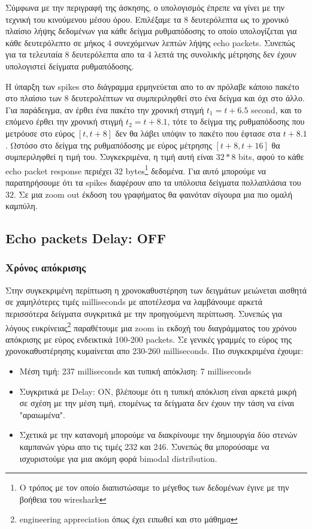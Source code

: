 \documentclass[hidelinks, 12pt, a4paper]{article}
\begin{document}
Σύμφωνα με την περιγραφή της άσκησης, ο υπολογισμός έπρεπε να γίνει με την τεχνική του κινούμενου μέσου όρου. Επιλέξαμε τα 8 δευτερόλεπτα ως το χρονικό πλαίσιο λήψης δεδομένων για κάθε δείγμα ρυθμαπόδοσης το οποίο υπολογίζεται για κάθε δευτερόλεπτο σε μήκος 4 συνεχόμενων λεπτών λήψης echo packets. Συνεπώς για τα τελευταία 8 δευτερόλεπτα απο τα 4 λεπτά της συνολικής μέτρησης δεν έχουν υπολογιστεί δείγματα ρυθμαπόδοσης. 

Η ύπαρξη των spikes στο διάγραμμα ερμηνεύεται απο το αν πρόλαβε κάποιο πακέτο στο πλαίσιο των 8 δευτερολέπτων να συμπεριληφθεί στο ένα δείγμα και όχι στο άλλο. Για παράδειγμα, αν έρθει ένα πακέτο την χρονική στιγμή $t_1 = t + 6.5$ second, και το επόμενο έρθει την χρονική στιγμή $t_2 = t + 8.1$, τότε το δείγμα της ρυθμαπόδοσης που μετρόυσε στο εύρος $[t, t+8]$ δεν θα λάβει υπόψιν το πακέτο που έφτασε στα $t + 8.1$. Ωστόσο στο δείγμα της ρυθμαπόδοσης με εύρος μέτρησης $[t+8, t+16]$ θα συμπεριληφθεί η τιμή του. Συγκεκριμένα, η τιμή αυτή είναι $32*8$ bits, αφού το κάθε echo packet response περιέχει 32 bytes\footnote{Ο τρόπος με τον οποίο διαπιστώσαμε το μέγεθος των δεδομένων έγινε με την βοήθεια του wireshark} δεδομένα. Για αυτό μπορούμε να παρατηρήσουμε ότι τα spikes διαφέρουν απο τα υπόλοιπα δείγματα πολλαπλάσια του $32$. Σε μια zoom out έκδοση του γραφήματος θα φαινόταν σίγουρα μια πιο ομαλή καμπύλη.


\subsection{Echo packets Delay: OFF}

\subsubsection{Χρόνος απόκρισης}
Στην συγκεκριμένη περίπτωση η χρονοκαθυστέρηση των δειγμάτων μειώνεται αισθητά σε χαμηλότερες τιμές milliseconds με αποτέλεσμα να λαμβάνουμε αρκετά περισσότερα δείγματα συγκριτικά με την προηγούμενη περίπτωση. Συνεπώς για λόγους ευκρίνειας\footnote{engineering appreciation όπως έχει ειπωθεί και στο μάθημα} παραθέτουμε μια zoom in εκδοχή του διαγράμματος του χρόνου απόκρισης με εύρος ενδεικτικά 100-200 packets. Σε γενικές γραμμές το εύρος της χρονοκαθυστέρησης κυμαίνεται απο 230-260 milliseconds. Πιο συγκεκριμένα έχουμε:
\begin{itemize}
    \item Μέση τιμή: 237 milliseconds και τυπική απόκλιση: 7 milliseconds 
    \item Συγκριτικά με Delay: ON, βλέπουμε ότι η τυπική απόκλιση είναι αρκετά μικρή σε σχέση με την μέση τιμή, επομένως τα δείγματα δεν έχουν την τάση να είναι "αραιωμένα".
    \item Σχετικά με την κατανομή μπορούμε να διακρίνουμε την δημιουργία δύο στενών καμπανών γύρω απο τις τιμές 232 και 246. Συνεπώς θα μπορούσαμε να ισχυριστούμε για μια ακόμη φορά bimodal distribution. 
\end{itemize}
\end{document}
